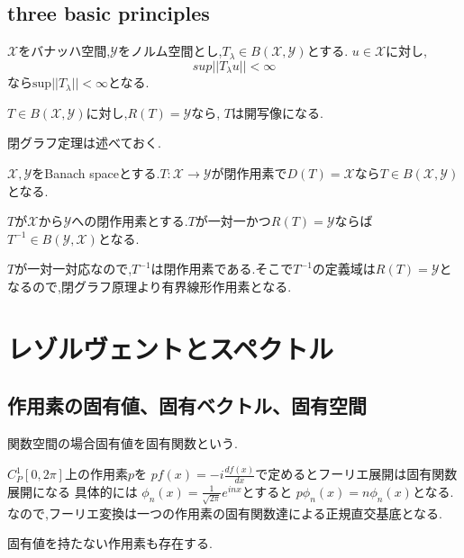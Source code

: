 \documentclass[uplatex]{jsbook}
\begin{document}
\subsection{three basic principles}

\begin{thm}[一様有界性原理]
$\mathcal{X}$をバナッハ空間,$\mathcal{Y}$をノルム空間とし,$T_{\lambda} \in B(\mathcal{X}, \mathcal{Y})$とする.
$u \in \mathcal{X}$に対し,
\begin{equation*}
 sup ||T_{\lambda}u || < \infty
\end{equation*}
なら$\mathrm{sup}|| T_{\lambda}|| < \infty$となる.
\end{thm}

\begin{thm}
 $T \in B(\mathcal{X}, \mathcal{Y})$に対し,$R(T)= \mathcal{Y}$なら,
$T$は開写像になる.
\end{thm}
閉グラフ定理は述べておく.
\begin{thm}
 $\mathcal{X}, \mathcal{Y}$をBanach spaceとする.$T: \mathcal{X} \to \mathcal{Y}$が閉作用素で$D(T)= \mathcal{X}$なら$T \in B(\mathcal{X}, \mathcal{Y})$となる.
\end{thm}

\begin{cor}
 $T$が$\mathcal{X}$から$\mathcal{Y}$への閉作用素とする.$T$が一対一かつ$R(T) = \mathcal{Y}$ならば$T^{-1} \in B(\mathcal{Y}, \mathcal{X})$となる.
\end{cor}
$T$が一対一対応なので,$T^{-1}$は閉作用素である.そこで$T^{-1}$の定義域は$R(T)=\mathcal{Y}$となるので,閉グラフ原理より有界線形作用素となる.


\section{レゾルヴェントとスペクトル}
\subsection{作用素の固有値、固有ベクトル、固有空間}
関数空間の場合固有値を固有関数という.


\begin{epl}
$C^1_P[0, 2\pi]$上の作用素$p$を
$pf(x) = - i \frac{df(x)}{dx}$で定めるとフーリエ展開は固有関数展開になる
具体的には
$\phi_n(x)= \frac{1}{\sqrt{2\pi}} e^{in x}$とすると
$p \phi_n(x) = n \phi_n(x)$となる.
なので,フーリエ変換は一つの作用素の固有関数達による正規直交基底となる.
\end{epl}

固有値を持たない作用素も存在する.
\end{document}
